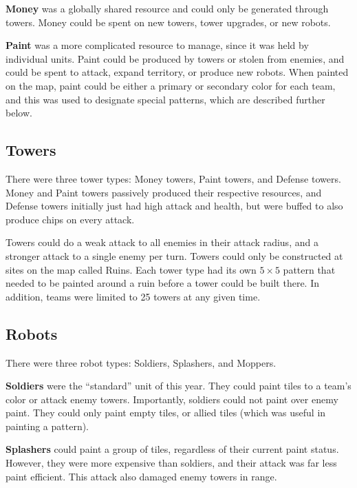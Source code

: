 \documentclass{article}
\begin{document}
  \medskip

  \textbf{Money} was a globally shared resource and could only be generated through towers. Money could be spent on new towers, tower upgrades, or new robots.
  
  \medskip

  \textbf{Paint} was a more complicated resource to manage, since it was held by individual units. Paint could be produced by towers or stolen from enemies, and could be spent to attack, expand territory, or produce new robots. When painted on the map, paint could be either a primary or secondary color for each team, and this was used to designate special patterns, which are described further below.

  \subsection{Towers}

  There were three tower types: Money towers, Paint towers, and Defense towers. Money and Paint towers passively produced their respective resources, and Defense towers initially just had high attack and health, but were buffed to also produce chips on every attack.

  \medskip

  Towers could do a weak attack to all enemies in their attack radius, and a stronger attack to a single enemy per turn. Towers could only be constructed at sites on the map called Ruins. Each tower type had its own $5 \times 5$ pattern that needed to be painted around a ruin before a tower could be built there. In addition, teams were limited to 25 towers at any given time.

  \subsection{Robots}

  There were three robot types: Soldiers, Splashers, and Moppers.

  \medskip

  \textbf{Soldiers} were the ``standard'' unit of this year. They could paint tiles to a team's color or attack enemy towers. Importantly, soldiers could not paint over enemy paint. They could only paint empty tiles, or allied tiles (which was useful in painting a pattern).

  \medskip

  \textbf{Splashers} could paint a group of tiles, regardless of their current paint status. However, they were more expensive than soldiers, and their attack was far less paint efficient. This attack also damaged enemy towers in range.
\end{document}
